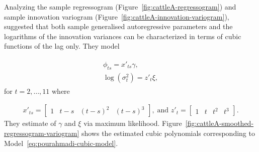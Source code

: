 %
%


Analyzing the sample regressogram (Figure~\ref{fig:cattleA-regressogram}) and sample innovation variogram (Figure~\ref{fig:cattleA-innovation-variogram}), \cite{pourahmadi1999joint}suggested that both sample generalised autoregressive parameters and the logarithms of the innovation variances can be characterized in terms of cubic functions of the lag only. They model 

\begin{align}
\begin{split} \label{eq:pourahmadi-cubic-model}
\phi_{ts} = x'_{ts}\gamma, \\
\log\left(\sigma_t^2\right) = z'_{t}\xi, 
\end{split}
\end{align}
\noindent
for $t = 2,\dots, 11$ where 

\begin{align*}
x'_{ts} = \begin{bmatrix} 1 & t - s& \left(t - s\right)^2 & \left(t - s\right)^3 \end{bmatrix},\; \mbox{and } z'_{t} = \begin{bmatrix} 1 & t& t^2& t^3 \end{bmatrix}.
\end{align*}
\noindent
They estimate of $\gamma$ and $\xi$ via maximum likelihood.  Figure~\ref{fig:cattleA-smoothed-regressogram-variogram} shows the estimated cubic polynomials corresponding to Model~\ref{eq:pourahmadi-cubic-model}. 

